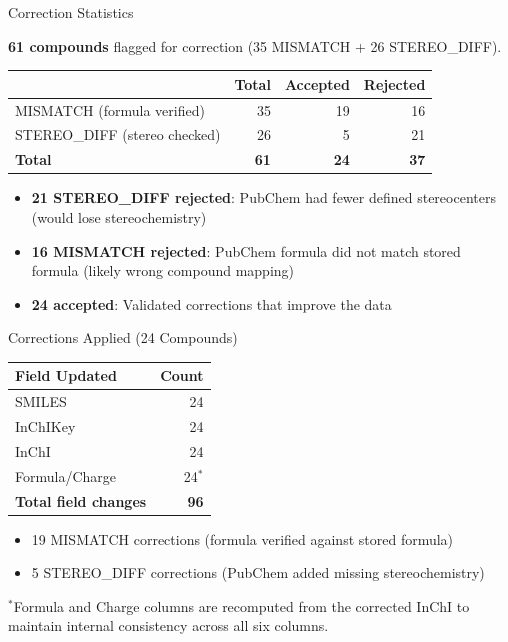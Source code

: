 \documentclass[aspectratio=169,11pt]{beamer}
\begin{document}
\begin{frame}{Correction Statistics}

\textbf{61 compounds} flagged for correction (35 MISMATCH + 26 STEREO\_DIFF).

\bigskip
\begin{table}[h]
\centering
\begin{tabular}{lrrr}
\toprule
& \textbf{Total} & \textbf{Accepted} & \textbf{Rejected} \\
\midrule
MISMATCH (formula verified)   & 35 & 19 & 16 \\
STEREO\_DIFF (stereo checked) & 26 &  5 & 21 \\
\midrule
\textbf{Total}                & \textbf{61} & \textbf{24} & \textbf{37} \\
\bottomrule
\end{tabular}
\end{table}

\bigskip
\begin{itemize}
  \item \textbf{21 STEREO\_DIFF rejected}: PubChem had fewer defined
        stereocenters (would lose stereochemistry)
  \item \textbf{16 MISMATCH rejected}: PubChem formula did not match stored
        formula (likely wrong compound mapping)
  \item \textbf{24 accepted}: Validated corrections that improve the data
\end{itemize}

\end{frame}

\begin{frame}{Corrections Applied (24 Compounds)}

\begin{table}[h]
\centering
\begin{tabular}{lr}
\toprule
\textbf{Field Updated} & \textbf{Count} \\
\midrule
SMILES         & 24 \\
InChIKey       & 24 \\
InChI          & 24 \\
Formula/Charge & 24$^*$ \\
\midrule
\textbf{Total field changes} & \textbf{96} \\
\bottomrule
\end{tabular}
\end{table}

\bigskip
\begin{itemize}
  \item 19 MISMATCH corrections (formula verified against stored formula)
  \item 5 STEREO\_DIFF corrections (PubChem added missing stereochemistry)
\end{itemize}

\bigskip
\footnotesize
$^*$Formula and Charge columns are recomputed from the corrected InChI
to maintain internal consistency across all six columns.

\end{frame}
\end{document}
